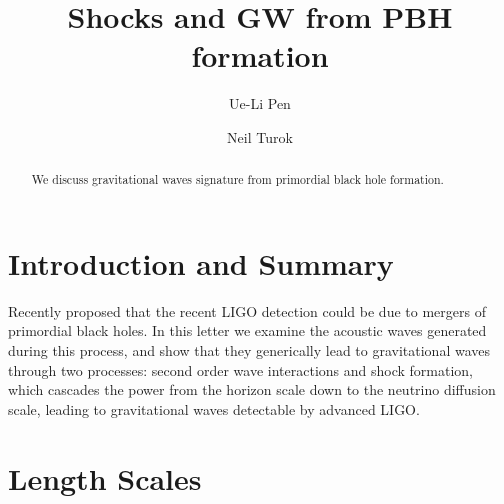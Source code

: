 \documentclass[aps,showpacs,twocolumn,floats,prd,superscriptaddress,nofootinbib]{revtex4}
\begin{document}
\title{Shocks and GW from PBH formation}


\author{Ue-Li Pen}

\author{Neil Turok}

\begin{abstract}
We discuss gravitational waves signature from primordial black hole formation.
\end{abstract}

\maketitle

\section{Introduction and Summary}

Recently \citet{2016arXiv160300464B} proposed that the recent LIGO
detection\cite{2016PhRvL.116f1102A} could be due to mergers of
primordial black holes.  In this letter we examine the acoustic waves
generated during this process, and show that they generically lead to
gravitational waves through two processes: second order wave
interactions and shock formation, which cascades the power from the
horizon scale down to the neutrino diffusion scale, leading to
gravitational waves detectable by advanced LIGO.

\section{Length Scales}
\end{document}
